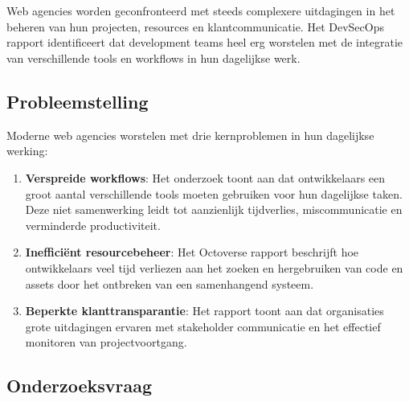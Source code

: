 
\chapter{}
\label{ch:inleiding}

Web agencies worden geconfronteerd met steeds complexere uitdagingen in het beheren van hun projecten, resources en klantcommunicatie. Het \textcite{GitLab2023} DevSecOps rapport identificeert dat development teams heel erg worstelen met de integratie van verschillende tools en workflows in hun dagelijkse werk.

\section{Probleemstelling}
\label{sec:probleemstelling}

Moderne web agencies worstelen met drie kernproblemen in hun dagelijkse werking:

\begin{enumerate}
    \item \textbf{Verspreide workflows}: Het \textcite{StackOverflow2023} onderzoek toont aan dat ontwikkelaars een groot aantal verschillende tools moeten gebruiken voor hun dagelijkse taken. Deze niet samenwerking leidt tot aanzienlijk tijdverlies, miscommunicatie en verminderde productiviteit.
    
    \item \textbf{Inefficiënt resourcebeheer}: Het \textcite{GitHub2023} Octoverse rapport beschrijft hoe ontwikkelaars veel tijd verliezen aan het zoeken en hergebruiken van code en assets door het ontbreken van een samenhangend systeem.
    
    \item \textbf{Beperkte klanttransparantie}: Het \textcite{StateOfAgile2023} rapport toont aan dat organisaties grote uitdagingen ervaren met stakeholder communicatie en het effectief monitoren van projectvoortgang.
\end{enumerate}

\section{Onderzoeksvraag}
\label{sec:onderzoeksvraag}

